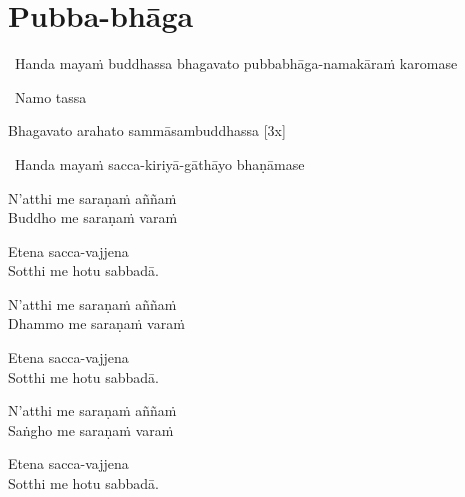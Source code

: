 \section{Pubba-bhāga}
\label{pubba-bhaga}

\begin{intro}
  \anglebracketleft\ \hspace{-0.5mm}Handa mayaṁ buddhassa bhagavato pubbabhāga-namakāraṁ karomase \hspace{-0.5mm}\anglebracketright\
\end{intro}

\medskip

\begin{intro}
  \anglebracketleft\ \hspace{-0.5mm}Namo tassa \hspace{-0.5mm}\anglebracketright\
\end{intro}

Bhagavato arahato sammāsambuddhassa \hfill{[3x]}

\smallskip

\begin{center}
  \anglebracketleft\ \hspace{-0.5mm}Handa mayaṁ sacca-kiriyā-gāthāyo bhaṇāmase \hspace{-0.5mm}\anglebracketright\
\end{center}

\vspace{-0.1cm}

\begin{pali-hang}
N'atthi me saraṇaṁ aññaṁ\\
Buddho me saraṇaṁ varaṁ
\end{pali-hang}
\begin{pali-hang}
Etena sacca-vajjena\\
Sotthi me hotu sabbadā.
\end{pali-hang}

\begin{pali-hang}
N'atthi me saraṇaṁ aññaṁ\\
Dhammo me saraṇaṁ varaṁ
\end{pali-hang}
\begin{pali-hang}
Etena sacca-vajjena\\
Sotthi me hotu sabbadā.
\end{pali-hang}

\begin{pali-hang}
N'atthi me saraṇaṁ aññaṁ\\
Saṅgho me saraṇaṁ varaṁ
\end{pali-hang}
\begin{pali-hang}
Etena sacca-vajjena\\
Sotthi me hotu sabbadā.
\end{pali-hang}

\clearpage

